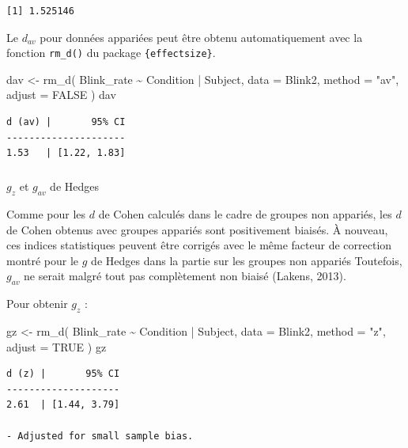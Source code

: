 \documentclass[
  letterpaper,
]{book}
\makeatletter
\let\oldsubparagraph\subparagraph
\renewcommand{\subparagraph}{
    \@ifstar
      \xxxSubParagraphStar
      \xxxSubParagraphNoStar
  }
\newcommand{\xxxSubParagraphStar}[1]{\oldsubparagraph*{#1}\mbox{}}
\newcommand{\xxxSubParagraphNoStar}[1]{\oldsubparagraph{#1}\mbox{}}
\newenvironment{Shaded}{\begin{snugshade}}{\end{snugshade}}
\newcommand{\AttributeTok}[1]{\textcolor[rgb]{0.40,0.45,0.13}{#1}}
\newcommand{\ConstantTok}[1]{\textcolor[rgb]{0.56,0.35,0.01}{#1}}
\newcommand{\FunctionTok}[1]{\textcolor[rgb]{0.28,0.35,0.67}{#1}}
\newcommand{\NormalTok}[1]{\textcolor[rgb]{0.00,0.23,0.31}{#1}}
\newcommand{\OtherTok}[1]{\textcolor[rgb]{0.00,0.23,0.31}{#1}}
\newcommand{\SpecialCharTok}[1]{\textcolor[rgb]{0.37,0.37,0.37}{#1}}
\newcommand{\StringTok}[1]{\textcolor[rgb]{0.13,0.47,0.30}{#1}}
\makeatother
\begin{document}
\begin{verbatim}
[1] 1.525146
\end{verbatim}

Le \(d_{av}\) pour données appariées peut être obtenu automatiquement
avec la fonction \texttt{rm\_d()} du package \texttt{\{effectsize\}}.

\begin{Shaded}
\begin{Highlighting}[]
\NormalTok{dav }\OtherTok{\textless{}{-}}
  \FunctionTok{rm\_d}\NormalTok{(}
\NormalTok{    Blink\_rate }\SpecialCharTok{\textasciitilde{}}\NormalTok{ Condition }\SpecialCharTok{|}\NormalTok{ Subject,}
    \AttributeTok{data =}\NormalTok{ Blink2,}
    \AttributeTok{method =} \StringTok{"av"}\NormalTok{,}
    \AttributeTok{adjust =} \ConstantTok{FALSE}
\NormalTok{  )}
\NormalTok{dav}
\end{Highlighting}
\end{Shaded}

\begin{verbatim}
d (av) |       95% CI
---------------------
1.53   | [1.22, 1.83]
\end{verbatim}

\subparagraph{\texorpdfstring{\(g_{z}\) et \(g_{av}\) de
Hedges}{g\_\{z\} et g\_\{av\} de Hedges}}\label{g_z-et-g_av-de-hedges}

Comme pour les \(d\) de Cohen calculés dans le cadre de groupes non
appariés, les \(d\) de Cohen obtenus avec groupes appariés sont
positivement biaisés. À nouveau, ces indices statistiques peuvent être
corrigés avec le même facteur de correction montré pour le \(g\) de
Hedges dans la partie sur les groupes non appariés Toutefois, \(g_{av}\)
ne serait malgré tout pas complètement non biaisé (Lakens, 2013).

Pour obtenir \(g_z\) :

\begin{Shaded}
\begin{Highlighting}[]
\NormalTok{gz }\OtherTok{\textless{}{-}}
  \FunctionTok{rm\_d}\NormalTok{(}
\NormalTok{    Blink\_rate }\SpecialCharTok{\textasciitilde{}}\NormalTok{ Condition }\SpecialCharTok{|}\NormalTok{ Subject,}
    \AttributeTok{data =}\NormalTok{ Blink2,}
    \AttributeTok{method =} \StringTok{"z"}\NormalTok{,}
    \AttributeTok{adjust =} \ConstantTok{TRUE}
\NormalTok{  )}
\NormalTok{gz}
\end{Highlighting}
\end{Shaded}

\begin{verbatim}
d (z) |       95% CI
--------------------
2.61  | [1.44, 3.79]

- Adjusted for small sample bias.
\end{verbatim}
\end{document}

